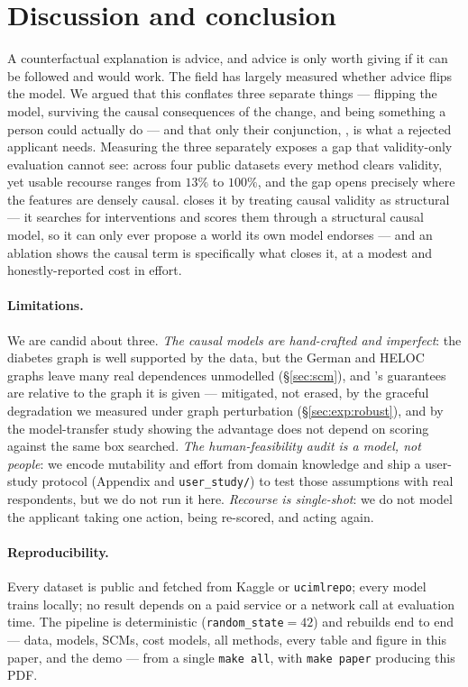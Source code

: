 \section{Discussion and conclusion}
\label{sec:conclusion}

A counterfactual explanation is advice, and advice is only worth giving if it can
be followed and would work. The field has largely measured whether advice flips
the model. We argued that this conflates three separate things --- flipping the
model, surviving the causal consequences of the change, and being something a
person could actually do --- and that only their conjunction, \Usable{}, is what a
rejected applicant needs. Measuring the three separately exposes a gap that
validity-only evaluation cannot see: across four public datasets every method
clears validity, yet usable recourse ranges from $13\%$ to $100\%$, and the gap
opens precisely where the features are densely causal. \cac{} closes it by
treating causal validity as structural --- it searches for interventions and
scores them through a structural causal model, so it can only ever propose a world
its own model endorses --- and an ablation shows the causal term is specifically
what closes it, at a modest and honestly-reported cost in effort.

\paragraph{Limitations.} We are candid about three. \emph{The causal models are
hand-crafted and imperfect}: the diabetes graph is well supported by the data, but
the German and HELOC graphs leave many real dependences unmodelled
(\S\ref{sec:scm}), and \cac{}'s guarantees are relative to the graph it is given
--- mitigated, not erased, by the graceful degradation we measured under graph
perturbation (\S\ref{sec:exp:robust}), and by the model-transfer study showing the
advantage does not depend on scoring against the same box \cac{} searched.
\emph{The human-feasibility audit is a model, not people}: we encode mutability
and effort from domain knowledge and ship a user-study protocol (Appendix and
\texttt{user\_study/}) to test those assumptions with real respondents, but we do
not run it here. \emph{Recourse is single-shot}: we do not model the applicant
taking one action, being re-scored, and acting again.

\paragraph{Reproducibility.} Every dataset is public and fetched from Kaggle or
\texttt{ucimlrepo}; every model trains locally; no result depends on a paid
service or a network call at evaluation time. The pipeline is deterministic
(\texttt{random\_state}$=42$) and rebuilds end to end --- data, models, SCMs, cost
models, all methods, every table and figure in this paper, and the demo --- from a
single \texttt{make all}, with \texttt{make paper} producing this PDF.

